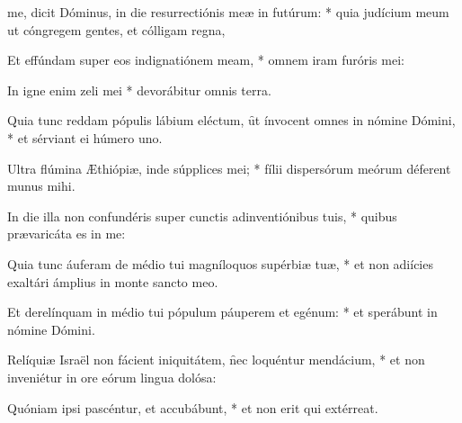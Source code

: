 \begin{psalmus}

 me, dicit Dóminus, in die resurrectiónis meæ in futúrum: * quia judícium meum ut cóngregem gentes, et cólligam regna,

Et effúndam super eos indignatiónem meam, * omnem iram furóris mei:

In igne enim zeli mei * devorábitur omnis terra.

Quia tunc reddam pópulis lábium eléctum, \f ut ínvocent omnes in nómine Dómini, * et sérviant ei húmero uno.

Ultra flúmina Æthiópiæ, inde súpplices mei; * fílii dispersórum meórum déferent munus mihi.

In die illa non confundéris super cunctis adinventiónibus tuis, * quibus prævaricáta es in me:

Quia tunc áuferam de médio tui magníloquos supérbiæ tuæ, * et non adiícies exaltári ámplius in monte sancto meo.

Et derelínquam in médio tui pópulum páuperem et egénum: * et sperábunt in nómine Dómini.

Relíquiæ Israël non fácient iniquitátem, \f nec loquéntur mendácium, * et non inveniétur in ore eórum lingua dolósa:

Quóniam ipsi pascéntur, et accubábunt, * et non erit qui extérreat.

\end{psalmus}
